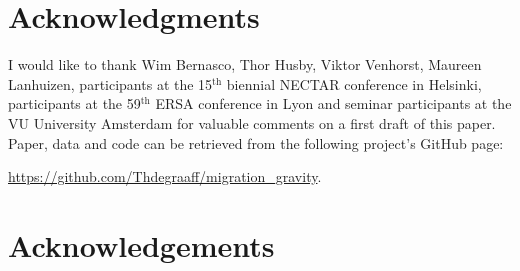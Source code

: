 \documentclass[11pt,parskip,abstracton,notitlepage, dvipsnames]{scrartcl}
\begin{document}
\section*{Acknowledgments}

I would like to thank Wim Bernasco, Thor Husby, Viktor Venhorst, Maureen
Lanhuizen, participants at the 15$^{\text{th}}$ biennial NECTAR conference in
Helsinki, participants at the 59$^{\text{th}}$ ERSA conference in Lyon and
seminar participants at the VU University Amsterdam for valuable comments on a
first draft of this paper. Paper, data and code can be retrieved from the
following project's GitHub page:

\href{https://github.com/Thdegraaff/migration_gravity}{https://github.com/Thdegraaff/migration\_gravity}.



\section*{Acknowledgements}

\begin{spacing}{1.2}
	\renewcommand*{\bibfont}{\footnotesize}
	\printbibliography
\end{spacing}
\end{document}
